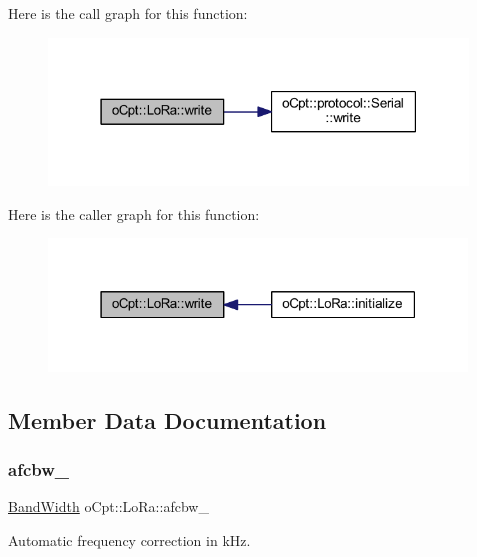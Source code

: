 Here is the call graph for this function\+:\nopagebreak
\begin{figure}[H]
\begin{center}
\leavevmode
\includegraphics[width=316pt]{classo_cpt_1_1_lo_ra_aa96080e6911f8355be8c59da33bfa9d1_cgraph}
\end{center}
\end{figure}
Here is the caller graph for this function\+:\nopagebreak
\begin{figure}[H]
\begin{center}
\leavevmode
\includegraphics[width=315pt]{classo_cpt_1_1_lo_ra_aa96080e6911f8355be8c59da33bfa9d1_icgraph}
\end{center}
\end{figure}


\subsection{Member Data Documentation}
\hypertarget{classo_cpt_1_1_lo_ra_a776e20c9dbac73ba02dca35c63ee4807}{}\label{classo_cpt_1_1_lo_ra_a776e20c9dbac73ba02dca35c63ee4807} 
\subsubsection{\texorpdfstring{afcbw\+\_\+}{afcbw\_}}
{\footnotesize\ttfamily \hyperlink{classo_cpt_1_1_lo_ra_abb27d22a584625eea0339906152c031d}{Band\+Width} o\+Cpt\+::\+Lo\+Ra\+::afcbw\+\_\+\hspace{0.3cm}{\ttfamily [protected]}}



Automatic frequency correction in k\+Hz. 



